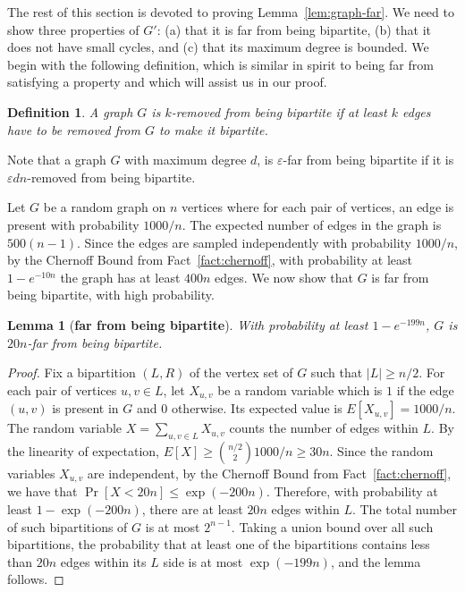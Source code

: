 \documentclass[11pt]{article}
\newtheorem{lemma}[theorem]{Lemma}
\newtheorem{definition}[theorem]{Definition}
\begin{document}
The rest of this section is devoted to proving Lemma~\ref{lem:graph-far}. We need to show three properties of $G'$: (a) that it is far from being bipartite, (b) that it does not have small cycles, and (c) that its maximum degree is bounded. We begin with the following definition, which is similar in spirit to being far from satisfying a property and which will assist us in our proof.
\begin{definition}
 A graph $G$ is $k$-removed from being bipartite if at least $k$ edges have to be removed from $G$ to
 make it bipartite.
 \label{def:k-removed}
\end{definition}

Note that a graph $G$ with maximum degree $d$, is $\varepsilon$-far from being bipartite if it is
$\varepsilon dn$-removed from being bipartite.

Let $G$ be a random graph on $n$ vertices where for each pair of vertices, an edge is present with
probability $1000/n$. The expected number of edges in the graph is $500(n-1)$. Since the edges are
sampled independently with probability $1000/n$, by the Chernoff Bound from
Fact~\ref{fact:chernoff}, with probability at least $1-e^{-10n}$ the graph has at least $400n$
edges.  We now show that $G$ is far from being bipartite, with high probability.
\begin{lemma}[\textbf{far from being bipartite}]
  With probability at least $1-e^{-199n}$, $G$ is $20n$-far from being bipartite.
  \label{lem:farness}
\end{lemma}
\begin{proof}
  Fix a bipartition $(L,R)$ of the vertex set of $G$ such that $|L|\ge n/2$.  For each pair of
  vertices $u,v\in L$, let $X_{u,v}$ be a random variable which is $1$ if the edge $(u,v)$ is
  present in $G$ and $0$ otherwise. Its expected value is $E[X_{u,v}] = 1000/n$. The random variable
  $X=\sum_{u,v\in L} X_{u,v}$ counts the number of edges within $L$. By the linearity of expectation, $E[X] \geq \binom{n/2}{2}1000/n \geq 30n$. Since the random variables $X_{u,v}$ are
  independent, by the Chernoff Bound from Fact~\ref{fact:chernoff}, we have that $\Pr[X < 20n] \le \exp(-200n)$. Therefore,
  with probability at least $1-\exp(-200n)$, there are at least $20n$ edges within $L$. The total
  number of such bipartitions of $G$ is at most $2^{n-1}$.
  Taking a union bound over all such bipartitions, the probability that at least one of the
  bipartitions contains less than $20n$ edges within its $L$ side is at most $\exp(-199n)$, and the lemma
  follows.
\end{proof}
\end{document}

